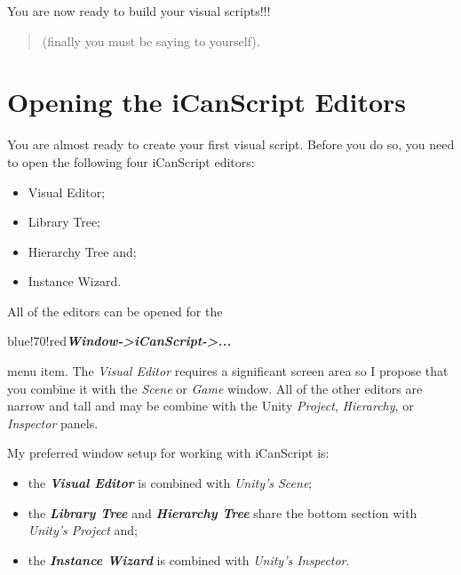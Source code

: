 You are now ready to build your visual scripts!!!

\begin{quote}

(finally you must be saying to yourself).
\end{quote}

\chapter{Opening the iCanScript Editors}
\label{openingtheicanscripteditors}

You are almost ready to create your first visual script. Before you do so, you need to open the following four iCanScript editors:

\begin{itemize}
\item Visual Editor;

\item Library Tree;

\item Hierarchy Tree and;

\item Instance Wizard.

\end{itemize}

All of the editors can be opened for the \begin{color}{blue!70!red}\emph{\textbf{Window->iCanScript->...}}\end{color} menu item. The \emph{Visual Editor} requires a significant screen area so I propose that you combine it with the \emph{Scene} or \emph{Game} window. All of the other editors are narrow and tall and may be combine with the Unity \emph{Project}, \emph{Hierarchy}, or \emph{Inspector} panels.

My preferred window setup for working with iCanScript is:

\begin{itemize}
\item the \emph{\textbf{Visual Editor}} is combined with \emph{Unity's Scene};

\item the \emph{\textbf{Library Tree}} and \emph{\textbf{Hierarchy Tree}} share the bottom section with \emph{Unity's Project} and;

\item the \emph{\textbf{Instance Wizard}} is combined with \emph{Unity's Inspector}.

\end{itemize}

